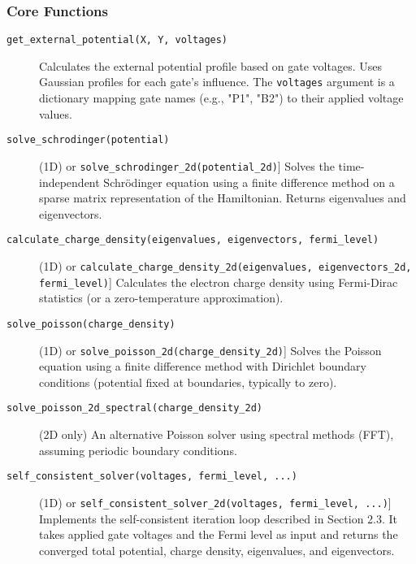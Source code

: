\documentclass{article}
\begin{document}
\subsubsection{Core Functions}
\begin{description}
    \item[\texttt{get\_external\_potential(X, Y, voltages)}] Calculates the external potential profile based on gate voltages. Uses Gaussian profiles for each gate's influence. The \texttt{voltages} argument is a dictionary mapping gate names (e.g., "P1", "B2") to their applied voltage values.
    \item[\texttt{solve\_schrodinger(potential)}] (1D) or \texttt{solve\_schrodinger\_2d(potential\_2d)}] Solves the time-independent Schrödinger equation using a finite difference method on a sparse matrix representation of the Hamiltonian. Returns eigenvalues and eigenvectors.
    \item[\texttt{calculate\_charge\_density(eigenvalues, eigenvectors, fermi\_level)}] (1D) or \texttt{calculate\_charge\_density\_2d(eigenvalues, eigenvectors\_2d, fermi\_level)}] Calculates the electron charge density using Fermi-Dirac statistics (or a zero-temperature approximation).
    \item[\texttt{solve\_poisson(charge\_density)}] (1D) or \texttt{solve\_poisson\_2d(charge\_density\_2d)}] Solves the Poisson equation using a finite difference method with Dirichlet boundary conditions (potential fixed at boundaries, typically to zero).
    \item[\texttt{solve\_poisson\_2d\_spectral(charge\_density\_2d)}] (2D only) An alternative Poisson solver using spectral methods (FFT), assuming periodic boundary conditions.
    \item[\texttt{self\_consistent\_solver(voltages, fermi\_level, ...)}] (1D) or \texttt{self\_consistent\_solver\_2d(voltages, fermi\_level, ...)}] Implements the self-consistent iteration loop described in Section 2.3. It takes applied gate voltages and the Fermi level as input and returns the converged total potential, charge density, eigenvalues, and eigenvectors.
\end{description}
\end{document}
